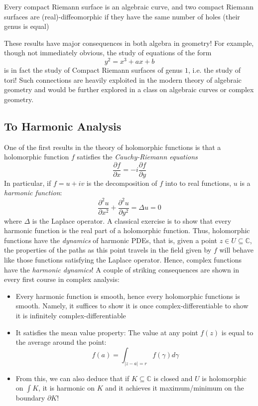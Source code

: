 \documentclass[oneside]{article}
\newcommand{\C}{\mathbb{C}}
\newcommand{\sse}{\subseteq}
\begin{document}
\begin{center}
    \addtolength{\leftskip}{2cm}  %
    \addtolength{\rightskip}{2cm} %
  Every compact Riemann surface is an algebraic curve, and two compact Riemann surfaces are (real)-diffeomorphic if
  they have the same number of holes (their genus is equal)
\end{center}

These results have major consequences in both algebra in geometry! For example, though not immediately
obvious, the study of equations of the form
\[
  y^2 = x^3 + ax + b
\]
is in fact the study of Compact Riemann surfaces of genus $1$, i.e. the study of tori! Such connections are
heavily exploited in the modern theory of algebraic geometry and would be further explored in a class on
algebraic curves or complex geometry.


\subsection{To Harmonic Analysis}

One of the first results in the theory of holomorphic functions is that a holomorphic function $f$ satisfies
the \emph{Cauchy-Riemann equations}
\[
  \frac{\partial f}{\partial x} = - i\frac{\partial f}{\partial y}
\]
In particular, if $f = u+iv$ is the decomposition of $f$ into to real functions, $u$ is a \emph{harmonic
function}:
\[
  \frac{\partial^2 u}{\partial x^2} + \frac{\partial^2 u}{\partial y^2} = \Delta u = 0
\]
where $\Delta$ is the Laplace operator. A classical exercise is to show that every harmonic function is the
real part of a holomorphic function. Thus, holomorphic functions have the \emph{dynamics} of harmonic PDEs,
that is, given a point $z \in U \sse \C$, the properties of the paths as this point travels in the field given
by $f$ will behave like those functions satisfying the Laplace operator. Hence, complex functions have the
\emph{harmonic dynamics}! A couple of striking consequences are shown in every first course in
complex analysis:

\begin{itemize}
  \item Every harmonic function is smooth, hence every holomorphic functions is smooth. Namely, it suffices to
    show it is once complex-differentiable to show it is infinitely complex-differentiable
  \item It satisfies the mean value property: The value at any point $f(z)$ is equal to the average around
    the point:
    \[
      f(a) = \int_{|z-a|=r} f(\gamma)d\gamma
    \]
  \item From this, we can also deduce that if $K \sse \C$ is closed and $U$ is holomorphic on $\int K$, it is
    harmonic on $K$ and it achieves it maximum/minimum on the boundary $\partial K$!
\end{itemize}
\end{document}
